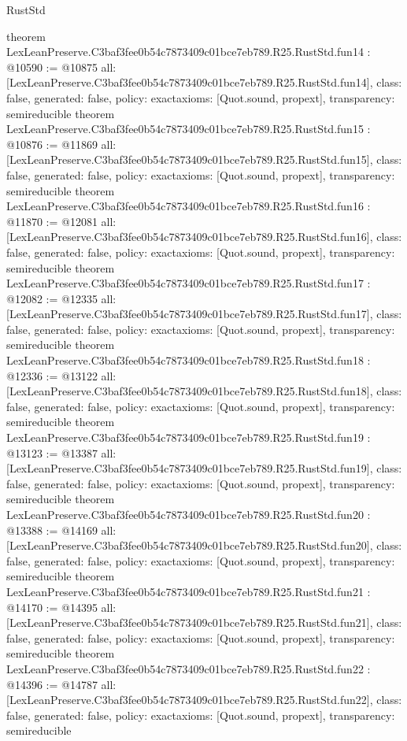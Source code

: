 \begin{lexlean}{RustStd}
\begin{coremodule}
{}
theorem LexLeanPreserve.C3baf3fee0b54c7873409c01bce7eb789.R25.RustStd.fun14 : @10590 := @10875 {
  all: [LexLeanPreserve.C3baf3fee0b54c7873409c01bce7eb789.R25.RustStd.fun14],
  class: false,
  generated: false,
  policy: exact{axioms: [Quot.sound, propext]},
  transparency: semireducible
}
theorem LexLeanPreserve.C3baf3fee0b54c7873409c01bce7eb789.R25.RustStd.fun15 : @10876 := @11869 {
  all: [LexLeanPreserve.C3baf3fee0b54c7873409c01bce7eb789.R25.RustStd.fun15],
  class: false,
  generated: false,
  policy: exact{axioms: [Quot.sound, propext]},
  transparency: semireducible
}
theorem LexLeanPreserve.C3baf3fee0b54c7873409c01bce7eb789.R25.RustStd.fun16 : @11870 := @12081 {
  all: [LexLeanPreserve.C3baf3fee0b54c7873409c01bce7eb789.R25.RustStd.fun16],
  class: false,
  generated: false,
  policy: exact{axioms: [Quot.sound, propext]},
  transparency: semireducible
}
theorem LexLeanPreserve.C3baf3fee0b54c7873409c01bce7eb789.R25.RustStd.fun17 : @12082 := @12335 {
  all: [LexLeanPreserve.C3baf3fee0b54c7873409c01bce7eb789.R25.RustStd.fun17],
  class: false,
  generated: false,
  policy: exact{axioms: [Quot.sound, propext]},
  transparency: semireducible
}
theorem LexLeanPreserve.C3baf3fee0b54c7873409c01bce7eb789.R25.RustStd.fun18 : @12336 := @13122 {
  all: [LexLeanPreserve.C3baf3fee0b54c7873409c01bce7eb789.R25.RustStd.fun18],
  class: false,
  generated: false,
  policy: exact{axioms: [Quot.sound, propext]},
  transparency: semireducible
}
theorem LexLeanPreserve.C3baf3fee0b54c7873409c01bce7eb789.R25.RustStd.fun19 : @13123 := @13387 {
  all: [LexLeanPreserve.C3baf3fee0b54c7873409c01bce7eb789.R25.RustStd.fun19],
  class: false,
  generated: false,
  policy: exact{axioms: [Quot.sound, propext]},
  transparency: semireducible
}
theorem LexLeanPreserve.C3baf3fee0b54c7873409c01bce7eb789.R25.RustStd.fun20 : @13388 := @14169 {
  all: [LexLeanPreserve.C3baf3fee0b54c7873409c01bce7eb789.R25.RustStd.fun20],
  class: false,
  generated: false,
  policy: exact{axioms: [Quot.sound, propext]},
  transparency: semireducible
}
theorem LexLeanPreserve.C3baf3fee0b54c7873409c01bce7eb789.R25.RustStd.fun21 : @14170 := @14395 {
  all: [LexLeanPreserve.C3baf3fee0b54c7873409c01bce7eb789.R25.RustStd.fun21],
  class: false,
  generated: false,
  policy: exact{axioms: [Quot.sound, propext]},
  transparency: semireducible
}
theorem LexLeanPreserve.C3baf3fee0b54c7873409c01bce7eb789.R25.RustStd.fun22 : @14396 := @14787 {
  all: [LexLeanPreserve.C3baf3fee0b54c7873409c01bce7eb789.R25.RustStd.fun22],
  class: false,
  generated: false,
  policy: exact{axioms: [Quot.sound, propext]},
  transparency: semireducible
}
\end{coremodule}
\end{lexlean}
